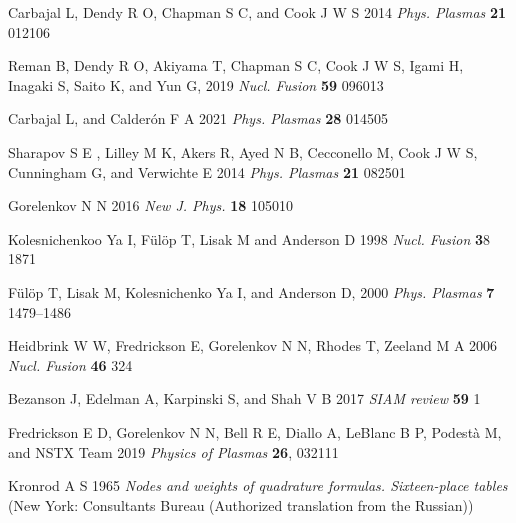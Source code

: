 \documentclass[12pt]{iopart}
\begin{document}
\begin{thebibliography}{9}
Carbajal L, Dendy R O, Chapman S C, and Cook J W S 2014 \textit{Phys. Plasmas} \textbf{21} 012106

Reman B, Dendy R O, Akiyama T, Chapman S C, Cook J W S, Igami  H, Inagaki S, Saito K, and Yun G, 2019 \textit{Nucl. Fusion} \textbf{59} 096013

Carbajal L, and Calderón F A 2021 \textit{Phys. Plasmas} \textbf{28} 014505

Sharapov S E , Lilley M K, Akers R, Ayed N B, Cecconello M, Cook J W S, Cunningham G, and Verwichte E 2014 \textit{Phys. Plasmas} \textbf{21} 082501

Gorelenkov N N 2016 \textit{New J. Phys.} \textbf{18} 105010

Kolesnichenkoo Ya I, F{\"u}l{\"o}p T, Lisak M and Anderson D 1998 \textit{Nucl. Fusion} {\textbf 38} 1871

F{\"u}l{\"o}p T, Lisak M, Kolesnichenko Ya I, and Anderson D, 2000 \textit{Phys. Plasmas} \textbf{7} 1479–1486

Heidbrink W W, Fredrickson E, Gorelenkov N N, Rhodes T, Zeeland  M A 2006 \textit{Nucl. Fusion} \textbf{46} 324

Bezanson J, Edelman A, Karpinski S, and Shah V B 2017 \textit{SIAM review} \textbf{59} 1

Fredrickson E D, Gorelenkov  N N, Bell R E, Diallo A, LeBlanc B P, Podestà  M, and NSTX Team 2019 \textit{Physics of Plasmas} \textbf{26}, 032111

Kronrod A S 1965 \textit{Nodes and weights of quadrature formulas. Sixteen-place tables} (New York: Consultants Bureau (Authorized translation from the Russian))


\end{thebibliography}
\end{document}
